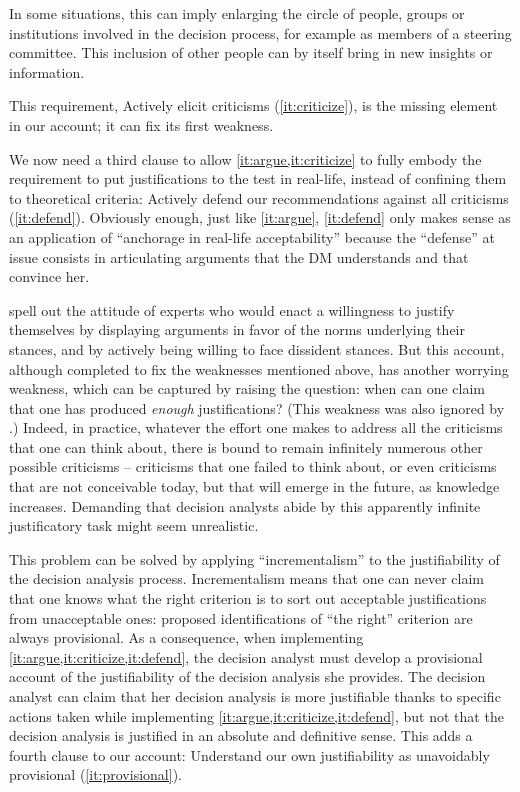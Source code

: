 \documentclass[preprint, french, english, 11pt, authoryear]{elsarticle}%
\begin{document}
In some situations, this can imply enlarging the circle of people, groups or institutions involved in the decision process, for example as members of a steering committee.
This inclusion of other people can by itself bring in new insights or information.
  
This requirement, Actively elicit criticisms (\ref{it:criticize}), is the missing element in our account; it can fix its first weakness.

We now need a third clause to allow \cref{it:argue,it:criticize} to fully embody the requirement to put justifications to the test in real-life, instead of confining them to theoretical criteria: Actively defend our recommendations against all criticisms (\ref{it:defend}).
Obviously enough, just like \cref{it:argue}, \cref{it:defend} only makes sense as an application of ``anchorage in real-life acceptability'' because the ``defense'' at issue consists in articulating arguments that the DM%
 understands and that convince her.

 spell out the attitude of experts who would enact a willingness to justify themselves by displaying arguments in favor of the norms underlying their stances, and by actively being willing to face dissident stances. 
But this account, although completed to fix the weaknesses mentioned above, has another worrying weakness, which can be captured by raising the question: when can one claim that one has produced \emph{enough} justifications? (This weakness was also ignored by  \citet{meinard_what_2017}.) 
Indeed, in practice, whatever the effort one makes to address all the criticisms that one can think about, there is bound to remain infinitely numerous other possible criticisms -- criticisms that one failed to think about, or even criticisms that are not conceivable today, but that will emerge in the future, as knowledge increases. 
Demanding that decision analysts abide by this apparently infinite justificatory task might seem unrealistic. 

This problem can be solved by applying ``incrementalism'' to the justifiability of the decision analysis process. 
Incrementalism means that one can never claim that one knows what the right criterion is to sort out acceptable justifications from unacceptable ones: proposed identifications of ``the right'' criterion are always provisional. 
As a consequence, when implementing \cref{it:argue,it:criticize,it:defend}, the decision analyst must develop a provisional account of the justifiability of the decision analysis she provides. 
The decision analyst can claim that her decision analysis is more justifiable thanks to specific actions taken while implementing \cref{it:argue,it:criticize,it:defend}, but not that the decision analysis is justified in an absolute and definitive sense. 
This adds a fourth clause to our account: Understand our own justifiability as unavoidably provisional (\ref{it:provisional}).
\end{document}
